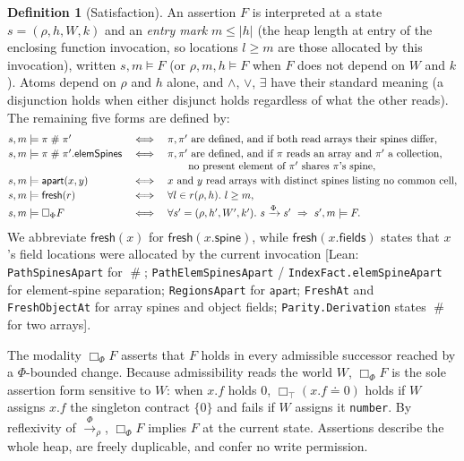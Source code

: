 \documentclass[10pt,a4paper]{article}
\theoremstyle{definition}
\newtheorem{definition}[theorem]{Definition}
\theoremstyle{remark}
\newcommand{\bx}[1]{\Box_{#1}}
\newcommand{\sep}{\mathrel{\#}}
\newcommand{\kw}[1]{\mathsf{#1}}
\newcommand{\fresh}{\kw{fresh}}
\newcommand{\apart}{\kw{apart}}
\newcommand{\len}[1]{|#1|}
\newcommand{\tr}[1]{\xrightarrow{#1}}
\newcommand{\code}[1]{\texttt{#1}}
\newcommand{\lean}[1]{\texttt{\small #1}}
\newcommand{\status}[1]{\textsf{\small[#1]}}
\begin{document}
\begin{definition}[Satisfaction]\label{def:sat}
An assertion $F$ is interpreted at a state $s=(\rho,h,W,k)$ and an
\emph{entry mark} $m\le\len h$ (the heap length at entry of the enclosing
function invocation, so locations $l\ge m$ are those allocated by this
invocation), written $s,m\models F$ (or $\rho,m,h\models F$ when $F$ does
not depend on $W$ and $k$).
Atoms depend on $\rho$ and $h$ alone, and $\wedge$, $\vee$, $\exists$
have their standard meaning (a disjunction holds when either disjunct
holds regardless of what the other reads). The remaining five forms are
defined by:
{\small\begin{displaymath}
\begin{array}{@{}lcl@{}}
s,m\models\pi\sep\pi' &\iff& \pi,\pi'\text{ are defined, and if both read arrays their spines differ},\\[2pt]
s,m\models\pi\sep\pi'.\kw{elemSpines} &\iff& \pi,\pi'\text{ are defined, and if }\pi\text{ reads an array and }\pi'\text{ a collection,}\\
 & & \qquad\text{no present element of }\pi'\text{ shares }\pi\text{'s spine},\\[2pt]
s,m\models\apart(x,y) &\iff& x\text{ and }y\text{ read arrays with distinct spines listing no common cell},\\[2pt]
s,m\models\fresh(r) &\iff& \forall l\in r(\rho,h).\ l\ge m,\\[2pt]
s,m\models\bx{\Phi}F &\iff& \forall s'=(\rho,h',W',k').\ s\tr{\Phi} s'\ \Rightarrow\ s',m\models F .
\end{array}
\end{displaymath}}
We abbreviate $\fresh(x)$ for $\fresh(x.\kw{spine})$, while
$\fresh(x.\kw{fields})$ states that $x$'s field locations were allocated
by the current invocation
\status{Lean: \lean{PathSpinesApart} for $\sep$; \lean{PathElemSpinesApart} / \lean{IndexFact.elemSpineApart} for element-spine separation; \lean{RegionsApart} for $\apart$; \lean{FreshAt} and \lean{FreshObjectAt} for array spines and object fields; \lean{Parity.Derivation} states $\sep$ for two arrays}.
\end{definition}

\noindent
The modality $\bx{\Phi}F$ asserts that $F$ holds in every admissible
successor reached by a $\Phi$-bounded change. Because admissibility reads
the world $W$, $\bx{\Phi}F$ is the sole assertion form sensitive to $W$:
when $x.f$ holds $0$, $\bx{\top}(x.f\doteq 0)$ holds if $W$ assigns $x.f$
the singleton contract $\{0\}$ and fails if $W$ assigns it \code{number}.
By reflexivity of $\tr{\Phi}_\rho$, $\bx{\Phi}F$ implies $F$ at the
current state. Assertions describe the whole heap, are freely duplicable,
and confer no write permission.
\end{document}
